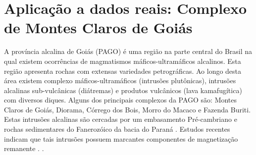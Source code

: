 \chapter{Aplicação a dados reais: Complexo de Montes Claros de Goiás}
\label{sec:real_application}

A província alcalina de Goiás (PAGO) é uma região na parte central do Brasil na qual existem ocorrências de magmatismos máficos-ultramáficos alcalinos. Esta região apresenta rochas com extensas variedades petrográficas. Ao longo desta área existem complexo máficos-ultramáficos (intrusões plutônicas), intrusões alcalinas sub-vulcânicas (diátremas) e produtos vulcânicos (lava kamafugítica) com diversos diques. Alguns dos principais complexos da PAGO são: Montes Claros de Goiás, Diorama, Córrego dos Bois, Morro do Macaco e Fazenda Buriti. Estas intrusões alcalinas são cercadas por um embasamento Pré-cambriano e rochas sedimentares do Fanerozóico da bacia do Paraná \citep{junqueira_brod_2005,carlson_etal_2007,marangoni_mantovani_2013,dutra_etal_2014}. Estudos recentes indicam que tais intrusões possuem marcantes componentes de magnetização remanente \citep{marangoni_mantovani_2013,oliveirajr_etal_2015,marangoni_etal_2016,zhang_etal_2018}.
.

